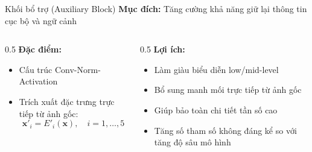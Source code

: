 \begin{frame}{Khối bổ trợ (Auxiliary Block)}
    \textbf{Mục đích:} Tăng cường khả năng giữ lại thông tin cục bộ và ngữ cảnh
    
    \vspace{0.3cm}
    \begin{columns}
        \begin{column}{0.5\textwidth}
            \textbf{Đặc điểm:}
            \begin{itemize}
                \item Cấu trúc Conv-Norm-Activation
                \item Trích xuất đặc trưng trực tiếp từ ảnh gốc:
                \[
                    \mathbf{x}'_i = E'_i(\mathbf{x}), \quad i = 1, \dots, 5
                \]
            \end{itemize}
        \end{column}
        \begin{column}{0.5\textwidth}
            \textbf{Lợi ích:}
            \begin{itemize}
                \item Làm giàu biểu diễn low/mid-level
                \item Bổ sung manh mối trực tiếp từ ảnh gốc
                \item Giúp bảo toàn chi tiết tần số cao
                \item Tăng số tham số không đáng kể so với tăng độ sâu mô hình
            \end{itemize}
        \end{column}
    \end{columns}
\end{frame}

